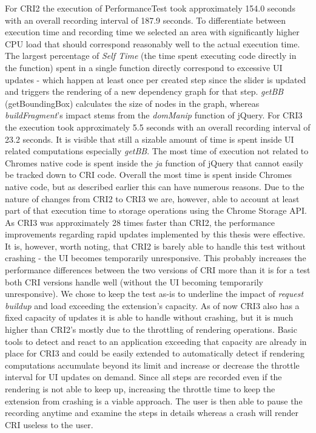 	For CRI2 the execution of PerformanceTest took approximately 154.0 seconds with an overall recording interval of 187.9 seconds. To differentiate between execution time and recording time we selected an area with significantly higher CPU load that should correspond reasonably well to the actual execution time. The largest percentage of \emph{Self Time} (the time spent executing code directly in the function) spent in a single function directly correspond to excessive UI updates - which happen at least once per created step since the slider is updated and triggers the rendering of a new dependency graph for that step. \emph{getBB} (getBoundingBox) calculates the size of nodes in the graph, whereas  \emph{buildFragment}'s impact stems from the \emph{domManip} function of jQuery.
	For CRI3 the execution took approximately 5.5 seconds with an overall recording interval of 23.2 seconds. It is visible that still a sizable amount of time is spent inside UI related computations especially \emph{getBB}. The most time of execution not related to Chromes native code is spent inside the \emph{ja} function of jQuery that cannot easily be tracked down to CRI code. Overall the most time is spent inside Chromes native code, but as described earlier this can have numerous reasons. Due to the nature of changes from CRI2 to CRI3 we are, however, able to account at least part of that execution time to storage operations using the Chrome Storage API. 
	As CRI3 was approximately 28 times faster than CRI2, the performance improvements regarding rapid updates implemented by this thesis were effective. It is, however, worth noting, that CRI2 is barely able to handle this test without crashing - the UI becomes temporarily unresponsive. This probably increases the performance differences between the two versions of CRI more than it is for a test both CRI versions handle well (without the UI becoming temporarily unresponsive). We chose to keep the test as-is to underline the impact of \emph{request buildup} and load exceeding the extension's capacity. 
	As of now CRI3 also has a fixed capacity of updates it is able to handle without crashing, but it is much higher than CRI2's mostly due to the throttling of rendering operations. Basic tools to detect and react to an application exceeding that capacity are already in place for CRI3 and could be easily extended to automatically detect if rendering computations accumulate beyond its limit and increase or decrease the throttle interval for UI updates on demand. Since all steps are recorded even if the rendering is not able to keep up, increasing the throttle time to keep the extension from crashing is a viable approach. The user is then able to pause the recording anytime and examine the steps in details whereas a crash will render CRI useless to the user.
	
